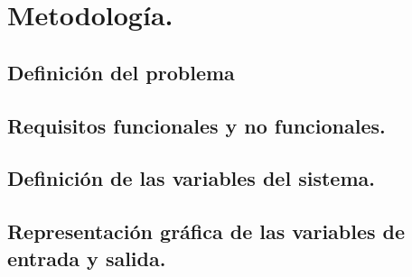 \section{Metodología.}
\subsection{Definición del problema}
\subsection{Requisitos funcionales y no funcionales.}
\subsection{Definición de las variables del sistema.}
\subsection{Representación gráfica de las variables de entrada y salida.}